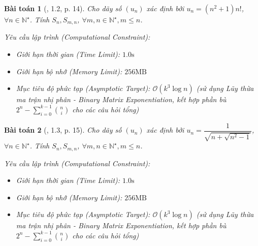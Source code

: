 \documentclass{article}
\newtheorem{baitoan}{Bài toán}
\begin{document}
\begin{baitoan}[\cite{Quoc_Long_Dat_Nam_VMC}, 1.2, p. 14]
	Cho dãy số $(u_n)$ xác định bởi $u_n = (n^2 + 1)n!$, $\forall n\in\mathbb{N}^\star$. Tính $S_n,S_{m,n}$, $\forall m,n\in\mathbb{N}^\star,m\le n$.

    \vspace{0.5em}
    \emph{Yêu cầu lập trình (Computational Constraint):}
    \begin{itemize}
        \item Giới hạn thời gian (Time Limit): $1.0\mathrm{s}$
        \item Giới hạn bộ nhớ (Memory Limit): $256\mathrm{MB}$
        \item Mục tiêu độ phức tạp (Asymptotic Target): $\mathcal{O}(k^3 \log n)$ (sử dụng Lũy thừa ma trận nhị phân - Binary Matrix Exponentiation, kết hợp phần bù $2^n - \sum_{i=0}^{k-1} \binom{n}{i}$ cho các câu hỏi tổng)
    \end{itemize}
\end{baitoan}


\begin{baitoan}[\cite{Quoc_Long_Dat_Nam_VMC}, 1.3, p. 15]
	Cho dãy số $(u_n)$ xác định bởi $u_n = \dfrac{1}{\sqrt{n + \sqrt{n^2 - 1}}}$, $\forall n\in\mathbb{N}^\star$. Tính $S_n,S_{m,n}$, $\forall m,n\in\mathbb{N}^\star,m\le n$.

    \vspace{0.5em}
    \emph{Yêu cầu lập trình (Computational Constraint):}
    \begin{itemize}
        \item Giới hạn thời gian (Time Limit): $1.0\mathrm{s}$
        \item Giới hạn bộ nhớ (Memory Limit): $256\mathrm{MB}$
        \item Mục tiêu độ phức tạp (Asymptotic Target): $\mathcal{O}(k^3 \log n)$ (sử dụng Lũy thừa ma trận nhị phân - Binary Matrix Exponentiation, kết hợp phần bù $2^n - \sum_{i=0}^{k-1} \binom{n}{i}$ cho các câu hỏi tổng)
    \end{itemize}
\end{baitoan}
\end{document}

